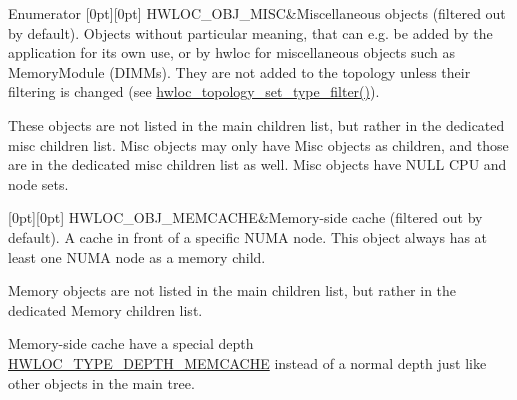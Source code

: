 \begin{DoxyEnumFields}{Enumerator}
[0pt][0pt]{}\mbox{\label{a00184_ggacd37bb612667dc437d66bfb175a8dc55a19f8a6953fa91efc76bcbcdf2d22de4d}} 
H\+W\+L\+O\+C\+\_\+\+O\+B\+J\+\_\+\+M\+I\+SC&Miscellaneous objects (filtered out by default). Objects without particular meaning, that can e.\+g. be added by the application for its own use, or by hwloc for miscellaneous objects such as Memory\+Module (D\+I\+M\+Ms). They are not added to the topology unless their filtering is changed (see \hyperlink{a00193_gad894e70f15f8d4aada7be8d1aba38b7e}{hwloc\+\_\+topology\+\_\+set\+\_\+type\+\_\+filter()}).

These objects are not listed in the main children list, but rather in the dedicated misc children list. Misc objects may only have Misc objects as children, and those are in the dedicated misc children list as well. Misc objects have N\+U\+LL C\+PU and node sets. \\
\hline

[0pt][0pt]{}\mbox{\label{a00184_ggacd37bb612667dc437d66bfb175a8dc55a0ed5bd98974729a0c476c39e917dabd6}} 
H\+W\+L\+O\+C\+\_\+\+O\+B\+J\+\_\+\+M\+E\+M\+C\+A\+C\+HE&Memory-\/side cache (filtered out by default). A cache in front of a specific N\+U\+MA node. This object always has at least one N\+U\+MA node as a memory child.

Memory objects are not listed in the main children list, but rather in the dedicated Memory children list.

Memory-\/side cache have a special depth \hyperlink{a00187_ggaf4e663cf42bbe20756b849c6293ef575a8b8d7d300c018c0eb65e6c9a9f162101}{H\+W\+L\+O\+C\+\_\+\+T\+Y\+P\+E\+\_\+\+D\+E\+P\+T\+H\+\_\+\+M\+E\+M\+C\+A\+C\+HE} instead of a normal depth just like other objects in the main tree. \\
\hline


\end{DoxyEnumFields}
